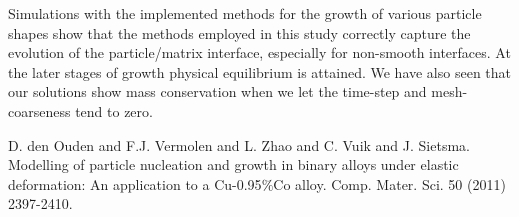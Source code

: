 Simulations with the implemented methods for the growth of various particle shapes show that the methods employed in this study correctly capture the evolution of the particle/matrix interface, especially for non-smooth interfaces. At the later stages of growth physical equilibrium is attained. We have also seen that our solutions show mass conservation when we let the time-step and mesh-coarseness tend to zero.


\begin{thebibliography}{10}

{\sc D. den Ouden and F.J. Vermolen and L. Zhao and C. Vuik and J. Sietsma}. {Modelling of particle nucleation and growth in binary alloys under elastic deformation: An application to a Cu-0.95$\%$Co alloy}. Comp. Mater. Sci. 50 (2011) 2397-2410.

\end{thebibliography}
